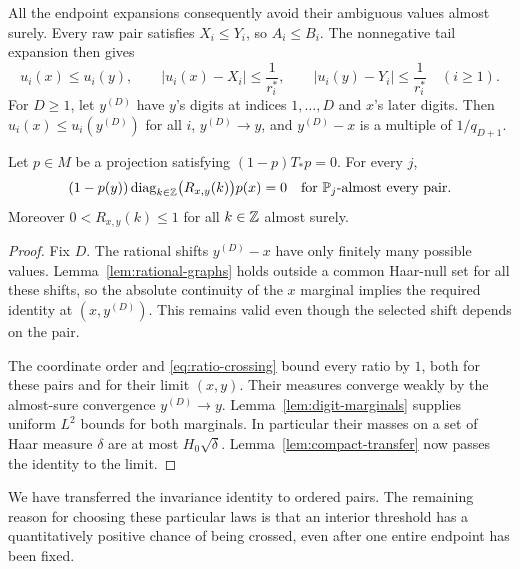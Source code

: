 All the endpoint expansions consequently avoid their ambiguous values
almost surely. Every raw pair satisfies $X_i\le Y_i$, so $A_i\le B_i$.
The nonnegative tail expansion then gives
\begin{equation}\label{eq:coordinate-order}
 u_i(x)\le u_i(y),\qquad
 |u_i(x)-X_i|\le\frac1{r_i^*},\qquad
 |u_i(y)-Y_i|\le\frac1{r_i^*}\quad(i\ge1).
\end{equation}
For $D\ge1$, let $y^{(D)}$ have $y$'s digits at indices $1,\ldots,D$
and $x$'s later digits. Then $u_i(x)\le u_i(y^{(D)})$ for all $i$,
$y^{(D)}\to y$, and $y^{(D)}-x$ is a multiple of $1/q_{D+1}$.

\begin{proposition}
\label{prop:ordered-couplings}
Let $p\in M$ be a projection satisfying $(1-p)T_*p=0$. For every $j$,
\begin{equation}\label{eq:coupling-identity}
 (1-p(y))\operatorname{diag}_{k\in\mathbb Z}\bigl(R_{x,y}(k)\bigr)p(x)=0
 \quad\text{for }\mathbb P_j\text{-almost every pair}.
\end{equation}
Moreover $0<R_{x,y}(k)\le1$ for all $k\in\mathbb Z$ almost surely.
\end{proposition}

\begin{proof}
Fix $D$. The rational shifts $y^{(D)}-x$ have only finitely many possible
values. Lemma~\ref{lem:rational-graphs} holds outside a common Haar-null
set for all these shifts, so the absolute continuity of the $x$ marginal
implies the required identity at $(x,y^{(D)})$. This remains valid even
though the selected shift depends on the pair.

The coordinate order and \eqref{eq:ratio-crossing} bound every ratio by
$1$, both for these pairs and for their limit $(x,y)$. Their measures
converge weakly by the almost-sure convergence $y^{(D)}\to y$.
Lemma~\ref{lem:digit-marginals} supplies uniform $L^2$ bounds for both
marginals. In particular their masses on a set of Haar measure $\delta$
are at most $H_0\sqrt\delta$. Lemma~\ref{lem:compact-transfer} now passes
the identity to the limit.
\end{proof}

We have transferred the invariance identity to ordered pairs. The remaining
reason for choosing these particular laws is that an interior threshold
has a quantitatively positive chance of being crossed, even after one
entire endpoint has been fixed.

